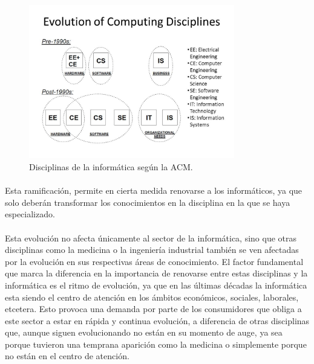 \documentclass[12pt, a4paper]{report}
\begin{document}
            \begin{figure}[htb]
				\centering
				\includegraphics[width=0.8\textwidth]{images/disciplines.jpg}
				\caption{Disciplinas de la informática según la ACM.} 						
                \label{fig:disciplina}
			\end{figure}
			
            \paragraph{}
            Esta ramificación, permite en cierta medida renovarse a los informáticos, ya que solo deberán transformar los conocimientos en la disciplina en la que se haya especializado. 
            
            \paragraph{}
            Esta evolución no afecta únicamente al sector de la informática, sino que  otras disciplinas como la medicina o la ingeniería industrial también se ven afectadas por la evolución en sus respectivas áreas de conocimiento. El factor fundamental que marca la diferencia en la importancia de renovarse entre estas disciplinas y la informática es el ritmo de evolución, ya que en las últimas décadas la informática esta siendo el centro de atención en los ámbitos económicos, sociales, laborales, etcetera. Esto provoca una demanda por parte de los consumidores que obliga a este sector a estar en rápida y continua evolución, a diferencia de otras disciplinas que, aunque siguen evolucionando no están en su momento de auge, ya sea porque tuvieron una temprana aparición como la medicina o simplemente porque no están en el centro de atención.           
            
\end{document}
